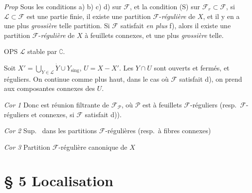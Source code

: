 \documentclass[11pt,a4paper]{article}
\begin{document}
\emph{Prop} Sous les conditions a) b) c) d)  \struck{\ill{}} sur
$\mathcal{F}$, et la condition (S) sur $\mathcal{F}_r \subset \mathcal{F}$,
si $\mathcal{L} \subset \mathcal{F}$ est une partie finie, il existe une
partition $\mathcal{F}$-\emph{régulière} de $X$, et il y en a une plus
\emph{grossière} telle partition. Si $\mathcal{F}$ satisfait \emph{en plus}
f), alors il existe une partition $\mathcal{F}$-\emph{régulière} de $X$ à
feuillets connexes, et une plus \emph{grossière} telle.

OPS $\mathcal{L}$ stable par $\complement$.

Soit $X' = \bigcup_{Y \in \mathcal{L}} \dot{Y} \cup Y_{\mathrm{sing}}$, $U = X
- X'$. Les $Y \cap U$ sont ouverts et fermés, et réguliers. On continue comme
plus haut,  dans le cas où $\mathcal{F}$ satisfait
d), on prend  aux composantes connexes des $U$.

\emph{Cor 1} Donc  est réunion filtrante de
$\mathcal{F}_{\mathcal{P}}$, où $\mathcal{P}$ est à feuillets
$\mathcal{F}$-réguliers (resp.\ $\mathcal{F}$-réguliers et connexes, si
$\mathcal{F}$ satisfait d)).

\emph{Cor 2} Sup.\  dans les partitions $\mathcal{F}$-régulières
(resp.\ à fibres connexes)

\emph{Cor 3} Partition $\mathcal{F}$-régulière canonique de $X$

\section*{§ 5 Localisation}
\end{document}

